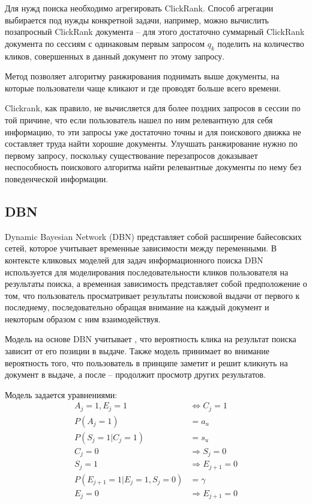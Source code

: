 \documentclass[diploma]{nanolab2015}
\begin{document}
Для нужд поиска необходимо агрегировать ClickRank. Способ агрегации выбирается под нужды конкретной задачи, например, можно вычислить позапросный ClickRank документа -- для этого достаточно суммарный ClickRank документа по сессиям с одинаковым первым запросом $q_k$ поделить на количество кликов, совершенных в данный документ по этому запросу.

Метод позволяет алгоритму ранжирования поднимать выше документы, на которые пользователи чаще кликают и где проводят больше всего времени.

Clickrank, как правило, не вычисляется для более поздних запросов в сессии по той причине, что если пользователь нашел по ним релевантную для себя информацию, то эти запросы уже достаточно точны и для поискового движка не составляет труда найти хорошие документы. Улучшать ранжирование нужно по первому запросу, поскольку существование перезапросов доказывает неспособность поискового алгоритма найти релевантные документы по нему без поведенческой информации.

\subsection{DBN}
Dynamic Bayesian Network (DBN) представляет собой расширение байесовских сетей, которое учитывает временные зависимости между переменными. В контексте кликовых моделей для задач информационного поиска DBN используется для моделирования последовательности кликов пользователя на результаты поиска, а временная зависимость представляет собой предположение о том, что пользователь просматривает результаты поисковой выдачи от первого к последнему, последовательно обращая внимание на каждый документ и некоторым образом с ним взаимодействуя.

Модель на основе DBN учитывает \cite{DBN}, что вероятность клика на результат поиска зависит от его позиции в выдаче. Также модель принимает во внимание вероятность того, что пользователь в принципе заметит и решит кликнуть на документ в выдаче, а после -- продолжит просмотр других результатов.

Модель задается уравнениями:
\begin{align}
    A_j = 1, E_j = 1                  & \Leftrightarrow C_j = 1 \label{dbn:1} \\
    P(A_j = 1)                        & = a_u                  \label{dbn:2}  \\
    P(S_j = 1| C_j = 1)               & = s_u                   \label{dbn:3} \\
    C_j = 0                           & \Rightarrow S_j = 0 \label{dbn:4}     \\
    S_j = 1                           & \Rightarrow E_{j+1} = 0 \label{dbn:5} \\
    P(E_{j+1} = 1 | E_j = 1, S_j = 0) & = \gamma                \label{dbn:6} \\
    E_j = 0                           & \Rightarrow E_{j+1} = 0 \label{dbn:7}
\end{align}
\end{document}

